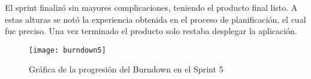 \begin{table}[H]
\label{TRA-59}
\end{table}

El sprint finalizó sin mayores complicaciones, teniendo el producto final listo. A estas alturas se notó la experiencia obtenida en el proceso de planificación, el cual fue preciso. Una vez terminado el producto solo restaba desplegar la aplicación.

\begin{figure}[h]
    \centering
    \texttt{[image: burndown5]}
    \caption[Burndown Sprint 5]{Gráfica de la progresión del Burndown en el Sprint 5}
\end{figure}